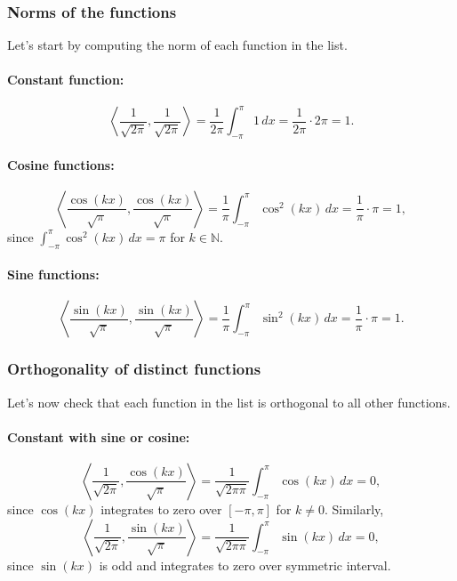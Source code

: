 \documentclass{article}
\begin{document}
\subsubsection*{Norms of the functions}

Let's start by computing the norm of each function in the list.

\paragraph{Constant function:}
\[
\left\langle \frac{1}{\sqrt{2\pi}}, \frac{1}{\sqrt{2\pi}} \right\rangle 
= \frac{1}{2\pi} \int_{-\pi}^{\pi} 1 \, dx 
= \frac{1}{2\pi} \cdot 2\pi = 1.
\]

\paragraph{Cosine functions:}
\[
\left\langle \frac{\cos(kx)}{\sqrt{\pi}}, \frac{\cos(kx)}{\sqrt{\pi}} \right\rangle 
= \frac{1}{\pi} \int_{-\pi}^{\pi} \cos^2(kx) \, dx 
= \frac{1}{\pi} \cdot \pi = 1,
\]
since $\int_{-\pi}^{\pi} \cos^2(kx) \, dx = \pi$ for $k\in\mathbb{N}$.

\paragraph{Sine functions:}
\[
\left\langle \frac{\sin(kx)}{\sqrt{\pi}}, \frac{\sin(kx)}{\sqrt{\pi}} \right\rangle 
= \frac{1}{\pi} \int_{-\pi}^{\pi} \sin^2(kx) \, dx 
= \frac{1}{\pi} \cdot \pi = 1.
\]

\subsubsection*{Orthogonality of distinct functions}

Let's now check that each function in the list is orthogonal to all other functions.

\paragraph{Constant with sine or cosine:}
\[
\left\langle \frac{1}{\sqrt{2\pi}}, \frac{\cos(kx)}{\sqrt{\pi}} \right\rangle 
= \frac{1}{\sqrt{2\pi\pi}} \int_{-\pi}^{\pi} \cos(kx) \, dx = 0,
\]
since $\cos(kx)$ integrates to zero over $[-\pi, \pi]$ for $k\neq 0$. 
Similarly,
\[
\left\langle \frac{1}{\sqrt{2\pi}}, \frac{\sin(kx)}{\sqrt{\pi}} \right\rangle 
= \frac{1}{\sqrt{2\pi\pi}} \int_{-\pi}^{\pi} \sin(kx) \, dx = 0,
\]
since $\sin(kx)$ is odd and integrates to zero over symmetric interval.
\end{document}
